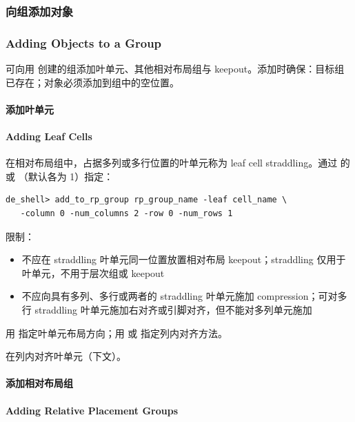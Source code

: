 \subsubsection{向组添加对象}
\subsubsection*{Adding Objects to a Group}

可向用  创建的组添加叶单元、其他相对布局组与 keepout。添加时确保：目标组已存在；对象必须添加到组中的空位置。

\paragraph{添加叶单元}
\paragraph*{Adding Leaf Cells}

在相对布局组中，占据多列或多行位置的叶单元称为 leaf cell straddling。通过  的  或 （默认各为 1）指定：
\begin{lstlisting}
de_shell> add_to_rp_group rp_group_name -leaf cell_name \
   -column 0 -num_columns 2 -row 0 -num_rows 1
\end{lstlisting}

限制：
\begin{itemize}
  \item 不应在 straddling 叶单元同一位置放置相对布局 keepout；straddling 仅用于叶单元，不用于层次组或 keepout
  \item 不应向具有多列、多行或两者的 straddling 叶单元施加 compression；可对多行 straddling 叶单元施加右对齐或引脚对齐，但不能对多列单元施加
\end{itemize}

用  指定叶单元布局方向；用  或  指定列内对齐方法。

\begin{seeAlsoBox}
在列内对齐叶单元（下文）。
\end{seeAlsoBox}

\paragraph{添加相对布局组}
\paragraph*{Adding Relative Placement Groups}

